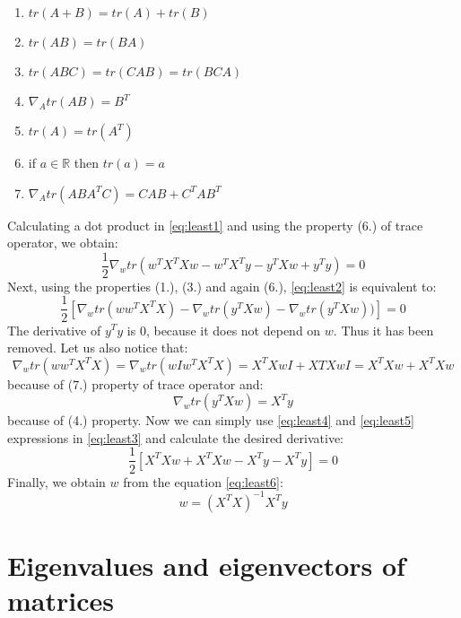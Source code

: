 \begin{appendices}
\begin{enumerate}
    \item $tr(A+B) = tr(A)+tr(B)$
    \item $tr(AB) = tr(BA)$
    \item $tr(ABC) = tr(CAB) = tr(BCA)$
    \item $\nabla_Atr(AB) = B^T$
    \item $tr(A)=tr(A^T)$
    \item if $a \in \mathbb{R}$ then $tr(a)=a$
    \item $\nabla_Atr(ABA^TC) = CAB+C^TAB^T$
\end{enumerate}
Calculating a dot product in \ref{eq:least1} and using the property (6.) of trace operator, we obtain:
\begin{equation}\label{eq:least2}
    \frac{1}{2} \nabla_w tr(w^TX^TXw-w^TX^Ty-y^TXw+y^Ty) = 0
\end{equation}
Next, using the properties (1.), (3.) and again (6.), \ref{eq:least2} is equivalent to:
\begin{equation}\label{eq:least3}
    \frac{1}{2}[\nabla_wtr(ww^TX^TX)-\nabla_wtr(y^TXw)-\nabla_wtr(y^TXw))] = 0
\end{equation}
The derivative of $y^Ty$ is $0$, because it does not depend on $w$. Thus it has been removed. Let us also notice that:
\begin{equation}\label{eq:least4}
    \nabla_wtr(ww^TX^TX) = \nabla_wtr(wIw^TX^TX) = X^TXwI + XTXwI = X^TXw+X^TXw
\end{equation}
because of (7.) property of trace operator and:
\begin{equation}\label{eq:least5}
    \nabla_wtr(y^TXw) = X^Ty
\end{equation}
because of (4.) property.
Now we can simply use \ref{eq:least4} and \ref{eq:least5} expressions in \ref{eq:least3} and calculate the desired derivative:
\begin{equation}\label{eq:least6}
    \frac{1}{2}[X^TXw+X^TXw-X^Ty-X^Ty] = 0
\end{equation}
Finally, we obtain $w$ from the equation \ref{eq:least6}:
\begin{equation}
    w=(X^TX)^{-1}X^Ty
\end{equation}

\newpage
\section{Eigenvalues and eigenvectors of matrices}
\label{app:eigen}


\end{appendices}
